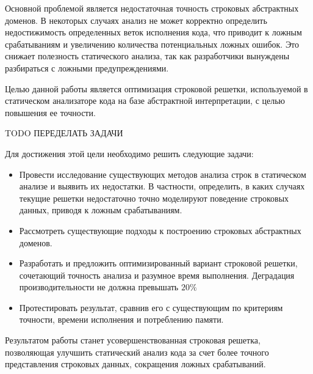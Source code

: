 Основной проблемой является недостаточная точность строковых абстрактных доменов. В некоторых случаях анализ не может корректно определить недостижимость определенных веток исполнения кода, что приводит к ложным срабатываниям и увеличению количества потенциальных ложных ошибок. Это снижает полезность статического анализа, так как разработчики вынуждены разбираться с ложными предупреждениями.

Целью данной работы является оптимизация строковой решетки, используемой в статическом анализаторе кода на базе абстрактной интерпретации, с целью повышения ее точности.

TODO ПЕРЕДЕЛАТЬ ЗАДАЧИ

Для достижения этой цели необходимо решить следующие задачи:

\begin{itemize}
\item Провести исследование существующих методов анализа строк в статическом анализе и выявить их недостатки. В частности, определить, в каких случаях текущие решетки недостаточно точно моделируют поведение строковых данных, приводя к ложным срабатываниям.

\item Рассмотреть существующие подходы к построению строковых абстрактных доменов.

\item Разработать и предложить оптимизированный вариант строковой решетки, сочетающий точность анализа и разумное время выполнения. Деградация производительности не должна превышать $20\%$

\item Протестировать результат, сравнив его с существующим по критериям точности, времени исполнения и потреблению памяти.
\end{itemize}

Результатом работы станет усовершенствованная строковая решетка, позволяющая улучшить статический анализ кода за счет более точного представления строковых данных, сокращения ложных срабатываний.

\newpage
